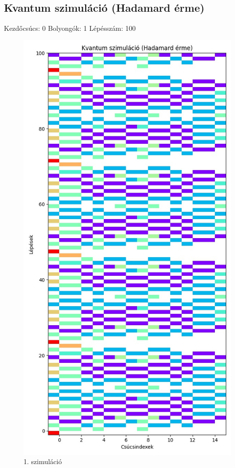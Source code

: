 \documentclass[14pt,a4paper]{article}
\begin{document}
\subsection{Kvantum szimuláció (Hadamard érme)}
Kezdőcsúcs: 0
Bolyongók: 1
Lépésszám: 100
\begin{figure}[H]
\centering
\includegraphics[width = 0.7\columnwidth]{sim_01/counts.jpg}
\caption{1. szimuláció}
\end{figure}
\end{document}
